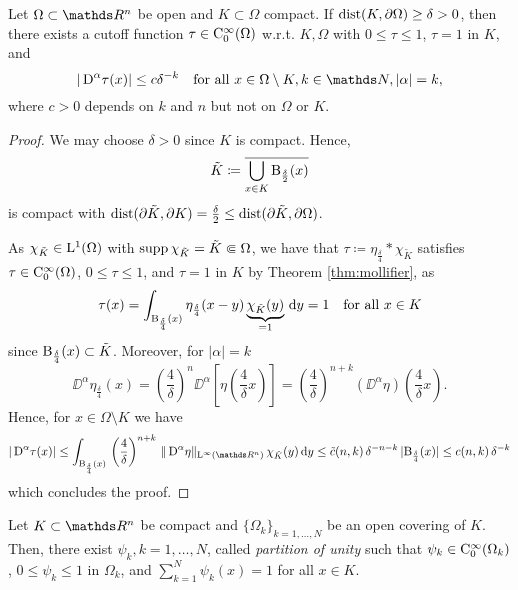 \begin{lem}
  \label{lem:cutoff}
  Let $\Omega \subset \R^n$ be open and $K \subset \Omega$ compact.
  If $\operatorname{dist}(K, \partial \Omega) \geq \delta > 0$, then there exists a cutoff function $\tau \in \mathrm{C}_0^\infty(\Omega)$ w.r.t. $K, \Omega$ with $0 \leq \tau \leq 1$, $\tau = 1$ in $K$, and 
  $$
|\DD^\alpha \tau(x) | \leq c \delta^{-k} \quad\text{for all } x \in \Omega \setminus K, k \in \N , |\alpha| = k,
  $$ 
  where $c > 0$ depends on $k$ and $n$ but not on $\Omega$ or $K$.
\end{lem}

\begin{proof}
  We may choose $\delta > 0$ since $K$ is compact.
  Hence, 
  $$
  \tilde K \coloneqq \overline{\bigcup_{x \in K} \mathrm{B}_{\frac{\delta}{2}}(x)}
  $$
  is compact with $\operatorname{dist}(\partial \tilde K, \partial K) = \frac{\delta}{2} \leq \operatorname{dist}(\partial \tilde K, \partial \Omega)$.

  As $\chi_{\tilde K} \in \mathrm{L}^1(\Omega)$ with $\operatorname{supp} \chi_{\tilde K} = \tilde K \Subset \Omega$, we have that $\tau \coloneqq \eta_{\frac{\delta}{4}} \ast \chi_{\tilde K}$ satisfies $\tau \in \mathrm{C}_0^\infty(\Omega)$, $0 \leq \tau \leq 1$, and $\tau = 1$ in $K$ by Theorem \ref{thm:mollifier}, as
  $$
  \tau(x) 
  = \int_{\mathrm{B}_{\frac{\delta}{4}}(x)}\eta_{\frac{\delta}{4}}(x - y) \underbrace{\chi_{\tilde K}(y)}_{= 1} \, {\operatorname{d}\!{y}} 
  = 1 \quad\text{for all }x \in K
  $$
  since $\mathrm{B}_{\frac{\delta}{4}}(x) \subset \tilde K$.
  Moreover, for $|\alpha| = k$
  $$
  \DD^\alpha \eta_{\frac{\delta}{4}}(x) 
  = \left( \frac{4}{\delta}\right)^n \DD^\alpha \left[ \eta \left( \frac{4 }{\delta} x \right) \right] 
  =  \left( \frac{4}{\delta}\right)^{n+k} (\DD^\alpha \eta)\left( \frac{4}{\delta} x \right).
  $$
  Hence, for $x \in \Omega \setminus K$ we have 
  $$
    |\DD^\alpha \tau (x) | 
    \leq \int_{\BB_{\frac{\delta}{4}}(x)}\, \left(\frac{4}{\delta}\right)^{n + k}\, \|\DD^\alpha \eta \|_{\Ell^\infty(\R^n)} \,\chi_{\tilde K}(y) \d y
    \leq \tilde c(n,k) \, \delta^{-n - k} \, |\BB_{\frac{\delta}{4}}(x)| \leq c(n,k)\, \delta^{-k}
 $$
 which concludes the proof.
\end{proof}

\begin{lem}
  \label{lem:partitionOfUnity}
  Let $K \subset \R^n$ be compact and $\{\Omega_k\}_{k = 1,\dots,N}$ be an open covering of $K$.
  Then, there exist $\psi_k, k=1,\dots,N$, called \emph{partition of unity} such that $\psi_k \in \mathrm{C}_0^\infty(\Omega_k)$, $0 \leq \psi_k \leq 1$ in $\Omega_k$, and $\sum_{k = 1}^N \psi_k(x) = 1$ for all $x \in K$.
\end{lem}

